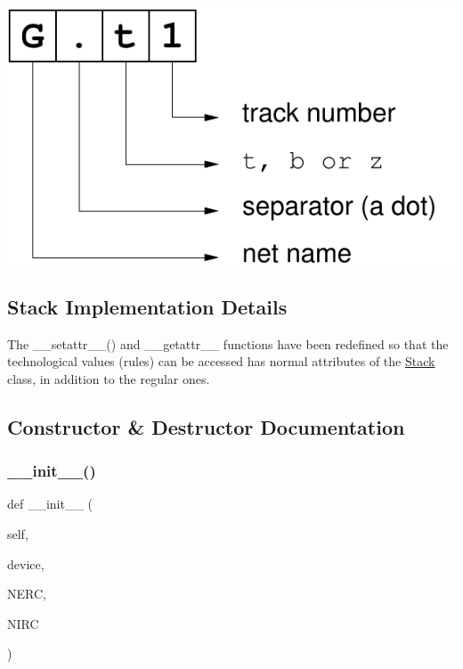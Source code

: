  
\begin{DoxyImage}
\includegraphics[width=.4\linewidth]{wiring-spec-1}
\end{DoxyImage}
\hypertarget{classpython_1_1Stack_1_1Stack_secStackImplDetails}{}\subsection{Stack Implementation Details}\label{classpython_1_1Stack_1_1Stack_secStackImplDetails}
The {\ttfamily \+\_\+\+\_\+setattr\+\_\+\+\_\+()} and {\ttfamily \+\_\+\+\_\+getattr\+\_\+\+\_\+} functions have been redefined so that the technological values (rules) can be accessed has normal attributes of the \mbox{\hyperlink{classpython_1_1Stack_1_1Stack}{Stack}} class, in addition to the regular ones. 

\subsection{Constructor \& Destructor Documentation}
\mbox{\label{classpython_1_1Stack_1_1Stack_a818e80b2a75b3e0d06f9826d1c60ecab}} 
\subsubsection{\texorpdfstring{\+\_\+\+\_\+init\+\_\+\+\_\+()}{\_\_init\_\_()}}
{\footnotesize\ttfamily def \+\_\+\+\_\+init\+\_\+\+\_\+ (\begin{DoxyParamCaption}\item[{}]{self,  }\item[{}]{device,  }\item[{}]{N\+E\+RC,  }\item[{}]{N\+I\+RC }\end{DoxyParamCaption})}



